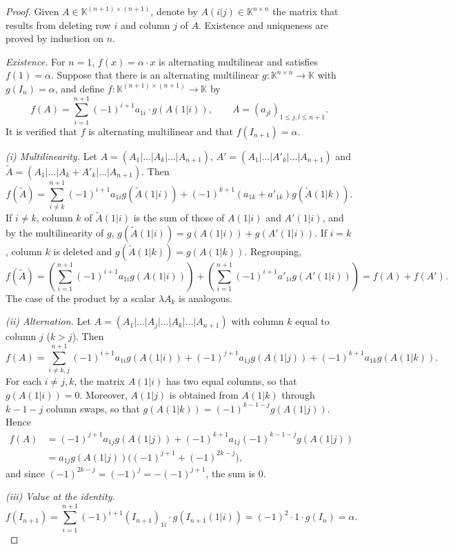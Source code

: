 \documentclass[11pt, a4paper]{article}
\begin{document}
\begin{proof}
Given $A \in \mathbb{K}^{(n+1) \times (n+1)}$, denote by $A(i|j) \in \mathbb{K}^{n \times n}$ the matrix that results from deleting row $i$ and column $j$ of $A$. Existence and uniqueness are proved by induction on $n$.

\textit{Existence.} For $n=1$, $f(x) = \alpha \cdot x$ is alternating multilinear and satisfies $f(1) = \alpha$. Suppose that there is an alternating multilinear $g: \mathbb{K}^{n \times n} \to \mathbb{K}$ with $g(I_n) = \alpha$, and define $f: \mathbb{K}^{(n+1) \times (n+1)} \to \mathbb{K}$ by
\[
f(A) = \sum_{i=1}^{n+1} (-1)^{i+1} a_{1i} \cdot g(A(1|i)), \qquad A=(a_{jl})_{1 \le j,l \le n+1}.
\]
It is verified that $f$ is alternating multilinear and that $f(I_{n+1}) = \alpha$.

\textit{(i) Multilinearity.} Let $A = (A_1|\dots|A_k|\dots|A_{n+1})$, $A' = (A_1|\dots|A'_k|\dots|A_{n+1})$ and $\tilde{A} = (A_1|\dots|A_k+A'_k|\dots|A_{n+1})$. Then
\[
f(\tilde{A}) = \sum_{i \neq k}^{n+1} (-1)^{i+1} a_{1i} g(\tilde{A}(1|i)) + (-1)^{k+1} (a_{1k} + a'_{1k}) g(\tilde{A}(1|k)).
\]
If $i \neq k$, column $k$ of $\tilde{A}(1|i)$ is the sum of those of $A(1|i)$ and $A'(1|i)$, and by the multilinearity of $g$, $g(\tilde{A}(1|i)) = g(A(1|i)) + g(A'(1|i))$. If $i = k$, column $k$ is deleted and $g(\tilde{A}(1|k)) = g(A(1|k))$. Regrouping,
\[
f(\tilde{A}) = \left( \sum_{i=1}^{n+1} (-1)^{i+1} a_{1i} g(A(1|i)) \right) + \left( \sum_{i=1}^{n+1} (-1)^{i+1} a'_{1i} g(A'(1|i)) \right) = f(A) + f(A').
\]
The case of the product by a scalar $\lambda A_k$ is analogous.

\textit{(ii) Alternation.} Let $A = (A_1|\dots|A_j|\dots|A_k|\dots|A_{n+1})$ with column $k$ equal to column $j$ ($k > j$). Then
\[
f(A) = \sum_{i \neq k,j}^{n+1} (-1)^{i+1} a_{1i} g(A(1|i)) + (-1)^{j+1} a_{1j} g(A(1|j)) + (-1)^{k+1} a_{1k} g(A(1|k)).
\]
For each $i \neq j,k$, the matrix $A(1|i)$ has two equal columns, so that $g(A(1|i)) = 0$. Moreover, $A(1|j)$ is obtained from $A(1|k)$ through $k-1-j$ column swaps, so that $g(A(1|k)) = (-1)^{k-1-j} g(A(1|j))$. Hence
\begin{align*}
f(A) &= (-1)^{j+1} a_{1j} g(A(1|j)) + (-1)^{k+1} a_{1j} (-1)^{k-1-j} g(A(1|j)) \\
&= a_{1j} g(A(1|j)) \big( (-1)^{j+1} + (-1)^{2k-j} \big),
\end{align*}
and since $(-1)^{2k-j} = (-1)^{j} = -(-1)^{j+1}$, the sum is $0$.

\textit{(iii) Value at the identity.}
\[
f(I_{n+1}) = \sum_{i=1}^{n+1} (-1)^{i+1} (I_{n+1})_{1i} \cdot g(I_{n+1}(1|i)) = (-1)^{2} \cdot 1 \cdot g(I_n) = \alpha.
\]


\end{proof}
\end{document}
